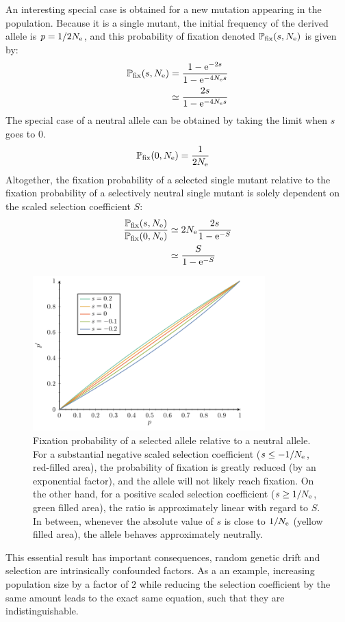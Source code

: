 An interesting special case is obtained for a new mutation appearing in the population.
Because it is a single mutant, the initial frequency of the derived allele is $p = 1 / 2 N_{\textrm{e}}$, and this probability of fixation denoted $\mathbb{P}_{\mathrm{fix}}(s, N_{\textrm{e}})$ is given by:
\begin{align}
   \mathbb{P}_{\mathrm{fix}}(s, N_{\textrm{e}}) & = \dfrac{1 - \mathrm{e}^{-2 s}}{1 - \mathrm{e}^{-4 N_{\textrm{e}} s}} \\
  				 & \simeq  \dfrac{2 s }{1 - \mathrm{e}^{-4 N_{\textrm{e}} s}}
\end{align}
The special case of a neutral allele can be obtained by taking the limit when $s$ goes to $0$.
\begin{align}
    \mathbb{P}_{\mathrm{fix}}(0, N_{\textrm{e}}) & = \dfrac{1}{2 N_{\textrm{e}}}
\end{align}
Altogether, the fixation probability of a selected single mutant relative to the fixation probability of a selectively neutral single mutant is solely dependent on the scaled selection coefficient $S$:
\begin{align}
    \dfrac{\mathbb{P}_{\mathrm{fix}}(s, N_{\textrm{e}})}{\mathbb{P}_{\mathrm{fix}}(0, N_{\textrm{e}})} & \simeq 2 N_{\textrm{e}} \dfrac{2s}{1 - \mathrm{e}^{-S}} \\
    & \simeq  \dfrac{S}{1 - \mathrm{e}^{-S}} \label{eq:p-fix}
\end{align}
\begin{figure}[H]
    \centering
    \includegraphics[width=0.8\textwidth, page=2] {figures.pdf}
    \caption[Relative fixation probability]{Fixation probability of a selected {allele} relative to a {neutral} {allele}.
    For a substantial negative scaled selection coefficient ($s \leq -1/N_{\textrm{e}}$, red-filled area), the probability of fixation is greatly reduced (by an exponential factor), and the allele will not likely reach fixation. On the other hand, for a positive scaled selection coefficient ($s \geq 1 / N_{\textrm{e}}$, green filled area), the ratio is approximately linear with regard to $S$. In between, whenever the absolute value of $s$ is close to $1 / N_{\textrm{e}}$ (yellow filled area), the allele behaves approximately neutrally.}
\end{figure}
This essential result has important consequences, random genetic drift and selection are intrinsically confounded factors.
As a an example, increasing population size by a factor of $2$ while reducing the selection coefficient by the same amount leads to the exact same equation, such that they are indistinguishable.

